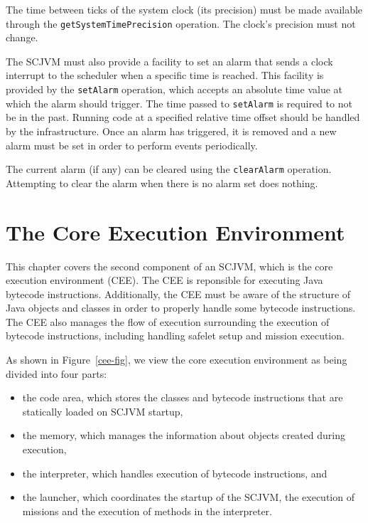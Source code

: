 \documentclass[a4paper,10pt]{report}
\begin{document}
The time between ticks of the system clock (its precision) must be
made available through the \texttt{get\-System\-Time\-Precision}
operation.
The clock's precision must not change.

The SCJVM must also provide a facility to set an alarm that sends a
clock interrupt to the scheduler when a specific time is reached.
This facility is provided by the \texttt{set\-Alarm} operation, which
accepts an absolute time value at which the alarm should trigger.
The time passed to \texttt{set\-Alarm} is required to not be in the
past.
Running code at a specified relative time offset should be handled by
the infrastructure.
Once an alarm has triggered, it is removed and a new alarm must be set
in order to perform events periodically.

The current alarm (if any) can be cleared using the
\texttt{clear\-Alarm} operation.
Attempting to clear the alarm when there is no alarm set does nothing.









\chapter{The Core Execution Environment}
\label{cee-chapter}

This chapter covers the second component of an SCJVM, which is the
core execution environment (CEE).
The CEE is reponsible for executing Java bytecode instructions.
Additionally, the CEE must be aware of the structure of Java objects
and classes in order to properly handle some bytecode instructions.
The CEE also manages the flow of execution surrounding the execution
of bytecode instructions, including handling safelet setup and mission
execution.

As shown in Figure~\ref{cee-fig}, we view the core execution
environment as being divided into four parts:
\begin{itemize}
\item the code area, which stores the classes and bytecode
  instructions that are statically loaded on SCJVM startup,
\item the memory, which manages the information about objects created
  during execution,
\item the interpreter, which handles execution of bytecode
  instructions, and
\item the launcher, which coordinates the startup of the SCJVM, the
  execution of missions and the execution of methods in the
  interpreter.
\end{itemize}
\end{document}
